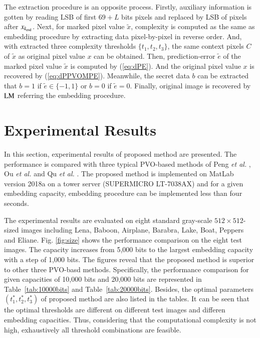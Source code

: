 \documentclass[review,3p,10pt,sort&compress]{elsarticle}
\begin{document}
The extraction procedure is an opposite process. Firstly, auxiliary information is gotten by reading LSB of first $69 + L$ bits pixels and replaced by LSB of pixels after $x_{k_{\rm end}}$. Next, for marked pixel value $\tilde{x}$, complexity is computed as the same as embedding procedure by extracting data pixel-by-pixel in reverse order. And, with extracted three complexity thresholds $\{t_1, t_2, t_3\}$, the same context pixels $C$ of $\tilde{x}$ as original pixel value $x$ can be obtained. Then, prediction-error $\tilde{e}$ of the marked pixel value $\tilde{x}$ is computed by (\ref{eq:dPE}). And the original pixel value $x$ is recovered by (\ref{eq:dPPVOMPE}). Meanwhile, the secret data $b$ can be extracted that $b = 1$ if $\tilde{e} \in \{-1, 1\}$ or $b = 0$ if $\tilde{e} = 0$. Finally, original image is recovered by ${\rm LM}$ referring the embedding procedure.

\section{Experimental Results}\label{sec:4}
In this section, experimental results of proposed method are presented. The performance is compared with three typical PVO-based methods of Peng \emph{et al.} \cite{Peng2014IPVO}, Ou \emph{et al.} \cite{Ou2014PVOk} and Qu \emph{et al.} \cite{Qu2015PPVO}. The proposed method is implemented on MatLab version 2018a on a tower server (SUPERMICRO LT-7038AX) and for a given embedding capacity, embedding procedure can be implemented less than four seconds.

The experimental results are evaluated on eight standard gray-scale $512 \times 512$-sized images including Lena, Baboon, Airplane, Barabra, Lake, Boat, Peppers and Eliane. Fig. \ref{fig:size} shows the performance comparison on the eight test images. The capacity increases from 5,000 bits to the largest embedding capacity with a step of 1,000 bits. The figures reveal that the proposed method is superior to other three PVO-basd methods. Specifically, the performance comparison for given capacities of 10,000 bits and 20,000 bits are represented in Table~\ref{tab:10000bits} and Table~\ref{tab:20000bits}. Besides, the optimal parameters $(t_1^*, t_2^*, t_3^*)$ of proposed method are also listed in the tables. It can be seen that the optimal thresholds are different on different test images and differen embedding capacities. Thus, considering that the computational complexity is not high, exhaustively all threshold combinations are feasible.
\end{document}
